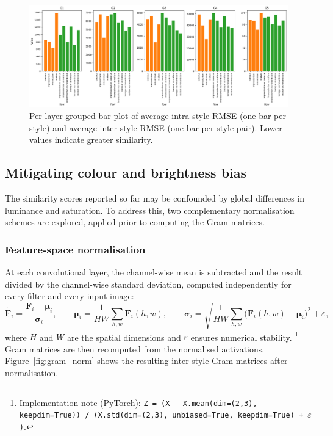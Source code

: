 \documentclass[a4paper,11pt]{article}
\begin{document}
\begin{figure}[htbp]
    \centering
    \includegraphics[width=\textwidth]{../figures/barplot_RMSE.png}
    \caption{Per‐layer grouped bar plot of average intra‐style RMSE (one bar per style) and average inter‐style RMSE (one bar per style pair). Lower values indicate greater similarity.}
    \label{fig:rmse_barplot}
\end{figure}

\subsection{Mitigating colour and brightness bias}\label{sec:norm_experiments}
The similarity scores reported so far may be confounded by global differences in luminance and saturation.  
To address this, two complementary normalisation schemes are explored, applied prior to computing the Gram matrices.

\subsubsection{Feature-space normalisation}
At each convolutional layer, the channel-wise mean is subtracted and the result divided by the channel-wise standard deviation, computed independently for every filter and every input image:
\begin{equation}
  \tilde{\mathbf{F}}_{i}=\frac{\mathbf{F}_{i}-\boldsymbol{\mu}_{i}}{\boldsymbol{\sigma}_{i}},
  \qquad
  \boldsymbol{\mu}_{i}=\textstyle\frac{1}{HW}\sum_{h,w}\mathbf{F}_{i}(h,w),
  \qquad
  \boldsymbol{\sigma}_{i}=\sqrt{\frac{1}{HW}\sum_{h,w}\bigl(\mathbf{F}_{i}(h,w)-\boldsymbol{\mu}_{i}\bigr)^{2}+\varepsilon},
  \label{eq:featnorm}
\end{equation}
where \(H\) and \(W\) are the spatial dimensions and \(\varepsilon\) ensures numerical stability.
\footnote{Implementation note (PyTorch):
\texttt{Z = (X - X.mean(dim=(2,3), keepdim=True)) / (X.std(dim=(2,3), unbiased=True, keepdim=True) + $\varepsilon$)}.}
Gram matrices are then recomputed from the normalised activations. Figure~\ref{fig:gram_norm} shows the resulting inter-style Gram matrices after normalisation.
\end{document}

